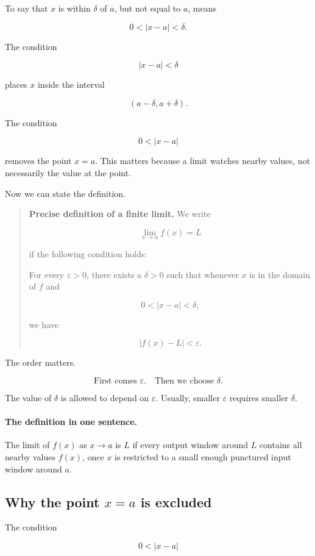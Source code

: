 To say that \(x\) is within \(\delta\) of \(a\), but not equal to \(a\), means

\[
0<|x-a|<\delta.
\]

The condition

\[
|x-a|<\delta
\]

places \(x\) inside the interval

\[
(a-\delta,a+\delta).
\]

The condition

\[
0<|x-a|
\]

removes the point \(x=a\).  This matters because a limit watches nearby values, not necessarily the value at the point.

Now we can state the definition.

\begin{quote}
\textbf{Precise definition of a finite limit.}
We write

\[
\lim_{x\to a}f(x)=L
\]

if the following condition holds:

For every \(\varepsilon>0\), there exists a \(\delta>0\) such that whenever \(x\) is in the domain of \(f\) and

\[
0<|x-a|<\delta,
\]

we have

\[
|f(x)-L|<\varepsilon.
\]
\end{quote}

The order matters.

\[
\boxed{
\text{First comes }\varepsilon.
\quad
\text{Then we choose }\delta.
}
\]

The value of \(\delta\) is allowed to depend on \(\varepsilon\).  Usually, smaller \(\varepsilon\) requires smaller \(\delta\).

\paragraph{The definition in one sentence.}
The limit of \(f(x)\) as \(x\to a\) is \(L\) if every output window around \(L\) contains all nearby values \(f(x)\), once \(x\) is restricted to a small enough punctured input window around \(a\).

\subsection{Why the point \(x=a\) is excluded}
\label{subsec:why-punctured}

The condition

\[
0<|x-a|
\]

